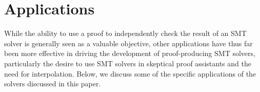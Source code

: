 \documentclass{llncs}
\begin{document}








\section{Applications}
\label{sec:app}

While the ability to use a proof to independently check the result of an SMT
solver is generally seen as a valuable objective, other applications have
thus far been more effective in driving the development of proof-producing SMT
solvers, particularly the desire to use SMT solvers in skeptical proof
assistants and the need for interpolation.  Below, we discuss some of the
specific applications of the solvers discussed in this paper.
\end{document}
